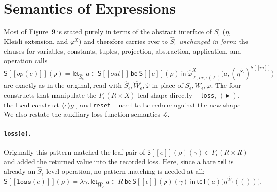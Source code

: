 \documentclass[11pt]{article}
\theoremstyle{plain}
\newcommand{\Ssem}[1]{\mathsf{S}[\![#1]\!]}
\newcommand{\eps}{\epsilon}
\newcommand{\op}{\mathit{op}}
\newcommand{\then}{\mathrel{\blacktriangleright}}
\newcommand{\loc}[1]{\langle #1 \rangle} %
\newcommand{\tell}{\mathsf{tell}}
\begin{document}
\section{Semantics of Expressions}

Most of Figure~9 is stated purely in terms of the abstract interface of $S_\eps$ ($\eta$,
Kleisli extension, and $\varphi^X$) and therefore carries over to $\widehat S_\eps$
\emph{unchanged in form}: the clauses for variables, constants, tuples, projection,
abstraction, application, and operation calls
\[
  \Ssem{\op(e)}(\rho) = \mathsf{let}_{\widehat S_\eps}\ a\in\Ssem{\mathit{out}}\ \mathsf{be}\ \Ssem{e}(\rho)
     \ \mathsf{in}\ \widehat\varphi^X_{\ell,\op,\eps(\ell)}\big(a,(\eta^{\widehat S_\eps})^{\Ssem{\mathit{in}}}\big)
\]
are exactly as in the original, read with $\widehat S_\eps,\widehat W_\eps,\widehat
\varphi$ in place of $S_\eps,W_\eps,\varphi$. The four constructs that manipulate the
$F_\eps(R\times X)$ leaf shape directly -- \texttt{loss}, $(\then)$, the local construct
$\loc{e}g^\eps$, and \texttt{reset} -- need to be redone against the new shape. We also
restate the auxiliary loss-function semantics $\mathcal L$.

\paragraph{\texttt{loss(e)}.} Originally this pattern-matched the leaf pair of
$\Ssem{e}(\rho)(\gamma)\in F_\eps(R\times R)$ and added the returned value into the recorded
loss. Here, since a bare $\tell$ is already an $\widehat S_\eps$-level operation, no pattern
matching is needed at all:
\[
  \Ssem{\mathtt{loss}(e)}(\rho) = \lambda\gamma.\
    \mathsf{let}_{\widehat W_\eps}\ a\in R\ \mathsf{be}\ \Ssem{e}(\rho)(\gamma)\ \mathsf{in}\
    \tell(a)\big(\eta^{\widehat W_\eps}(())\big).
\]
\end{document}
